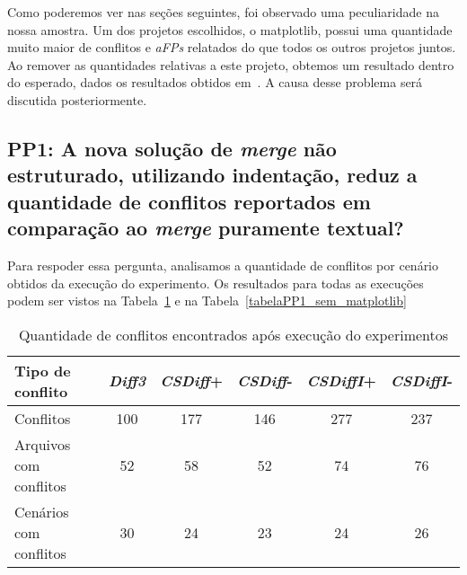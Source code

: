 Como poderemos ver nas seções seguintes, foi observado uma peculiaridade na nossa amostra. Um dos projetos escolhidos, o
matplotlib, possui uma quantidade muito maior de conflitos e \emph{aFPs} relatados do que todos os outros projetos juntos. Ao remover
as quantidades relativas a este projeto, obtemos um resultado dentro do esperado, dados os resultados obtidos
em~\cite{clem21,heitor21}. A causa desse problema será discutida posteriormente.

\subsection{PP1: A nova solução de \emph{merge} não estruturado, utilizando indentação,
	reduz a quantidade de conflitos reportados em comparação ao \emph{merge} puramente textual?}
Para respoder essa pergunta, analisamos a quantidade de conflitos por cenário obtidos da execução do experimento. Os
resultados para todas as execuções podem ser vistos na Tabela~\ref{tabelaPP1_com_matplotlib} e na
Tabela~\ref{tabelaPP1_sem_matplotlib}

\begin{table}[ht]
	\begin{center}
		\begin{tabular}{|l|c|c|c|c|c|}
			\hline
			\textbf{Tipo de conflito} & \textbf{\emph{Diff3}} & \textbf{\emph{CSDiff}+} & \textbf{\emph{CSDiff}-} & \textbf{\emph{CSDiffI}+} & \textbf{\emph{CSDiffI}-} \\
			\hline
			Conflitos                 & 100                   & 177                     & 146                     & 277                      & 237                      \\
			Arquivos com conflitos    & 52                    & 58                      & 52                      & 74                       & 76                       \\
			Cenários com conflitos    & 30                    & 24                      & 23                      & 24                       & 26                       \\
			\hline
		\end{tabular}
	\end{center}
	\caption{Quantidade de conflitos encontrados após execução do experimentos}\label{tabelaPP1_com_matplotlib}
\end{table}

